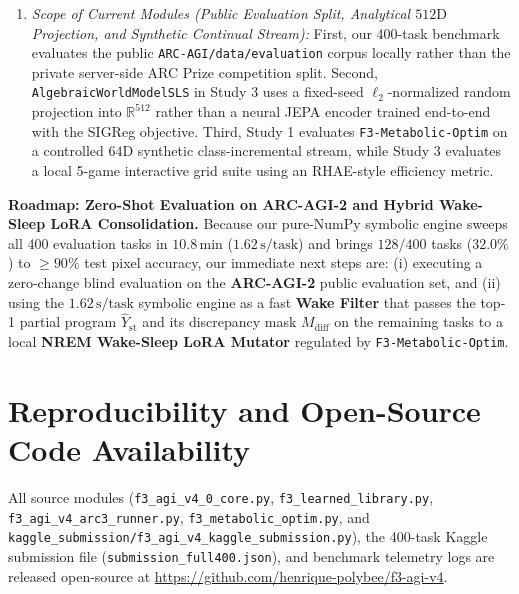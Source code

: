 \documentclass[10pt,a4paper]{article}
\begin{document}
\begin{enumerate}
    \item \emph{Scope of Current Modules (Public Evaluation Split, Analytical $512\text{D}$ Projection, and Synthetic Continual Stream):} First, our 400-task benchmark evaluates the public \texttt{ARC-AGI/data/evaluation} corpus locally rather than the private server-side ARC Prize competition split. Second, \texttt{AlgebraicWorldModelSLS} in Study 3 uses a fixed-seed $\ell_2$-normalized random projection into $\mathbb{R}^{512}$ rather than a neural JEPA encoder trained end-to-end with the SIGReg objective. Third, Study 1 evaluates \texttt{F3-Metabolic-Optim} on a controlled $64\text{D}$ synthetic class-incremental stream, while Study 3 evaluates a local 5-game interactive grid suite using an RHAE-style efficiency metric.
\end{enumerate}

\textbf{Roadmap: Zero-Shot Evaluation on ARC-AGI-2 and Hybrid Wake-Sleep LoRA Consolidation.}
Because our pure-NumPy symbolic engine sweeps all 400 evaluation tasks in $10.8\,\text{min}$ ($1.62\,\text{s/task}$) and brings $128/400$ tasks ($32.0\%$) to $\ge 90\%$ test pixel accuracy, our immediate next steps are: (i) executing a zero-change blind evaluation on the \textbf{ARC-AGI-2} public evaluation set, and (ii) using the $1.62\,\text{s/task}$ symbolic engine as a fast \textbf{Wake Filter} that passes the top-1 partial program $\hat{Y}_{\text{st}}$ and its discrepancy mask $M_{\text{diff}}$ on the remaining tasks to a local \textbf{NREM Wake-Sleep LoRA Mutator} regulated by \texttt{F3-Metabolic-Optim}.

\section*{Reproducibility and Open-Source Code Availability}
All source modules (\texttt{f3\_agi\_v4\_0\_core.py}, \texttt{f3\_learned\_library.py}, \texttt{f3\_agi\_v4\_arc3\_runner.py}, \texttt{f3\_metabolic\_optim.py}, and \texttt{kaggle\_submission/f3\_agi\_v4\_kaggle\_submission.py}), the 400-task Kaggle submission file (\texttt{submission\_full400.json}), and benchmark telemetry logs are released open-source at \url{https://github.com/henrique-polybee/f3-agi-v4}.
\end{document}
